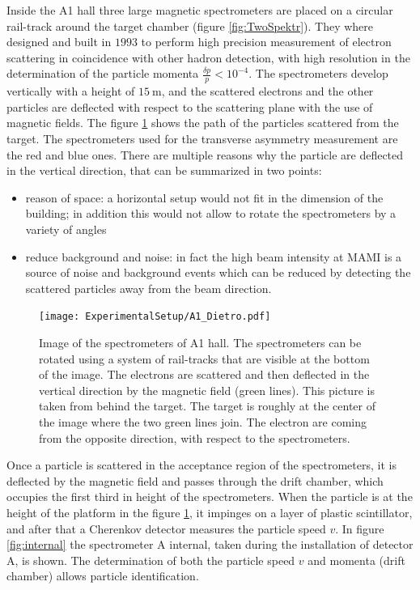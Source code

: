 Inside the A1 hall three large magnetic spectrometers are placed on a circular rail-track around the target chamber (figure \ref{fig:TwoSpektr}). They where designed and built in $1993$ to perform high precision measurement of electron scattering in coincidence with other hadron detection, with high resolution in the determination of the particle momenta $\frac{\delta p}{p} < 10^{-4}$. The spectrometers develop vertically with a height of $\SI{15}{\meter}$, and the scattered electrons and the other particles are deflected with respect to the scattering plane with the use of magnetic fields. The figure \ref{fig:TwoDetectors} shows the path of the particles scattered from the target. The spectrometers used for the transverse asymmetry measurement are the red and blue ones. There are multiple reasons why the particle are deflected in the vertical direction, that can be summarized in two points: 

\begin{itemize}
\item reason of space: a horizontal setup would not fit in the dimension of the building; in addition this would not allow to rotate the spectrometers by a variety of angles
\item reduce background and noise: in fact the high beam intensity at MAMI is a source of noise and background events which can be reduced by detecting the scattered particles away from the beam direction.
\end{itemize}    

\begin{figure}
\centering
\caption{Image of the spectrometers of A1 hall. The spectrometers can be rotated using a system of rail-tracks that are visible at the bottom of the image. The electrons are scattered and then deflected in the vertical direction by the magnetic field (green lines). This picture is taken from behind the target. The target is roughly at the center of the image where the two green lines join. The electron are coming from the opposite direction, with respect to the spectrometers.}\label{fig:TwoDetectors}
\texttt{[image: ExperimentalSetup/A1\_Dietro.pdf]}
\end{figure}
  
Once a particle is scattered in the acceptance region of the spectrometers, it is deflected by the magnetic field and passes through the drift chamber, which occupies the first third in height of the spectrometers. 
When the particle is at the height of the platform in the figure \ref{fig:TwoDetectors}, it impinges on a layer of plastic scintillator, and after that a Cherenkov detector  measures the particle speed $v$. In figure \ref{fig:internal} the spectrometer A internal, taken during the installation of detector A, is shown. The determination of both the particle speed $v$ and momenta (drift chamber) allows particle identification.

